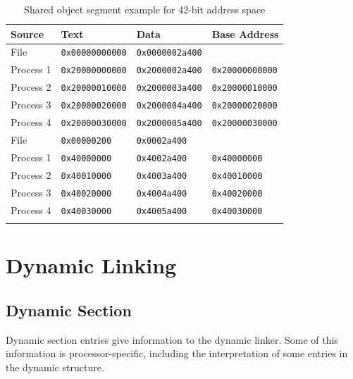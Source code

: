 \documentclass[USenglish,fontsize=11pt,twoside,%
  toc=bib,toc=idx,toc=graduated,numbers=noendperiod,
  bookmarks=true,
  bookmarksnumbered=true,
  bookmarksopen=true,
  bookmarksopenlevel=1,
  breaklinks=true,
  colorlinks=true,
  linkcolor=black,
  pdfpagelayout={TwoPageRight},
  pdfusetitle=true
]{scrreprt}
\newenvironment{DIFnomarkup}{}{} %
\begin{document}
\begin{table}
  \centering
  \begin{DIFnomarkup}
  \begin{tabular}{llll}
    \toprule
    Source & Text & Data & Base Address \\
    \midrule
    \ifzseries
    File & \texttt{0x00000000000} & \texttt{0x0000002a400} & \\
    Process 1 & \texttt{0x20000000000} & \texttt{0x2000002a400} &
    \texttt{0x20000000000} \\
    Process 2 & \texttt{0x20000010000} & \texttt{0x2000003a400} &
    \texttt{0x20000010000} \\
    Process 3 & \texttt{0x20000020000} & \texttt{0x2000004a400} &
    \texttt{0x20000020000} \\
    Process 4 & \texttt{0x20000030000} & \texttt{0x2000005a400} &
    \texttt{0x20000030000} \\
    \else
    File & \texttt{0x00000200} & \texttt{0x0002a400} & \\
    Process 1 & \texttt{0x40000000} & \texttt{0x4002a400} &
    \texttt{0x40000000} \\
    Process 2 & \texttt{0x40010000} & \texttt{0x4003a400} &
    \texttt{0x40010000} \\
    Process 3 & \texttt{0x40020000} & \texttt{0x4004a400} &
    \texttt{0x40020000} \\
    Process 4 & \texttt{0x40030000} & \texttt{0x4005a400} &
    \texttt{0x40030000} \\
    \fi
    \bottomrule
  \end{tabular}
  \end{DIFnomarkup}
  \caption{Shared object segment example\ifzseries{} for 42-bit
    address space\fi}
  \label{tab:soseg}
\end{table}

\section{Dynamic Linking}
\label{dynamiclinking}
\subsection{Dynamic Section}
Dynamic section entries give information to the dynamic linker.  Some
of this information is processor-specific, including the
interpretation of some entries in the dynamic structure.
\end{document}
